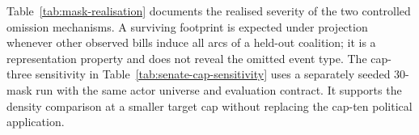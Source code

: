 \documentclass{nws}
\begin{document}
Table~\ref{tab:mask-realisation} documents the realised severity of the two controlled omission mechanisms. A surviving footprint is expected under projection whenever other observed bills induce all arcs of a held-out coalition; it is a representation property and does not reveal the omitted event type. The cap-three sensitivity in Table~\ref{tab:senate-cap-sensitivity} uses a separately seeded 30-mask run with the same actor universe and evaluation contract. It supports the density comparison at a smaller target cap without replacing the cap-ten political application.






\end{document}

